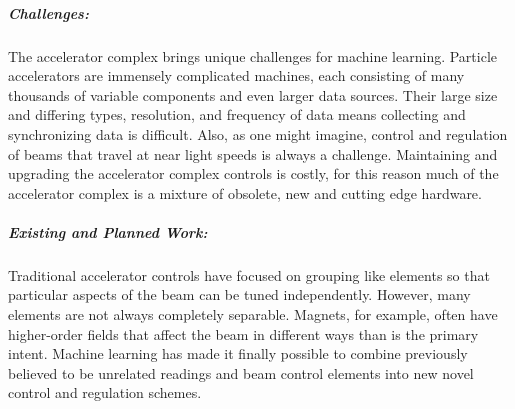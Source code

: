 \subparagraph*{Challenges:} 
            The accelerator complex brings unique challenges for machine learning. Particle accelerators are immensely complicated machines, each consisting of many thousands of variable components and even larger data sources. 
            Their large size and differing types, resolution, and frequency of data means collecting and synchronizing data is difficult. 
            Also, as one might imagine, control and regulation of beams  that travel at near light speeds is always a challenge. 
            Maintaining and upgrading the accelerator complex controls is costly, for this reason much of the accelerator complex is a mixture of obsolete, new and cutting edge hardware. 
            
\subparagraph*{Existing and Planned Work:} 
            Traditional accelerator controls have focused on grouping like elements so that particular aspects of the beam can be tuned independently. However, many elements are not always completely separable. 
            Magnets, for example, often have higher-order fields that affect the beam in different ways than is the primary intent. 
            Machine learning has made it finally possible to combine previously believed to be unrelated readings and beam control elements into new novel control and regulation schemes. 
            
